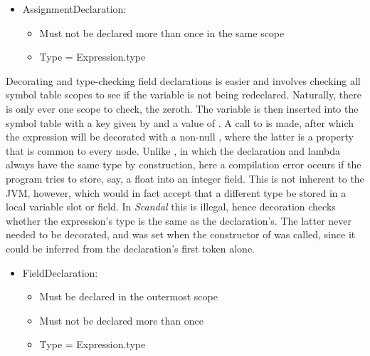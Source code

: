 \begin{itemize}
	\item AssignmentDeclaration:
		\begin{itemize}
			\item Must not be declared more than once in the same scope
			\item Type = Expression.type
		\end{itemize}
\end{itemize}

Decorating and type-checking field declarations is easier and involves checking all symbol table scopes to see if the variable is not being redeclared. Naturally, there is only ever one scope to check, the zeroth. The variable is then inserted into the symbol table with a key given by  and a value of . A call to  is made, after which the expression will be decorated with a non-null , where the latter is a property that is common to every node. Unlike , in which the declaration and lambda always have the same type by construction, here a compilation error occurs if the program tries to store, say, a float into an integer field. This is not inherent to the JVM, however, which would in fact accept that a different type be stored in a local variable slot or field. In \emph{Scandal} this is illegal, hence decoration checks whether the expression's type is the same as the declaration's. The latter never needed to be decorated, and was set when the constructor of  was called, since it could be inferred from the declaration's first token alone.

\begin{itemize}
	\item FieldDeclaration:
		\begin{itemize}
			\item Must be declared in the outermost scope
			\item Must not be declared more than once
			\item Type = Expression.type
		\end{itemize}
\end{itemize}

